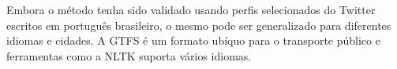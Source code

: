 \documentclass[
	12pt,				%
	oneside,			%
	a4paper,			%
	english,			%
	brazil				%
	]{abntex2ppgsi}
\begin{document}
{{Embora o método tenha sido validado usando perfis selecionados do Twitter escritos em português brasileiro, o mesmo pode ser generalizado para diferentes idiomas e cidades. A GTFS é um formato ubíquo para o transporte público e ferramentas como a NLTK suporta vários idiomas.





}}
\end{document}
